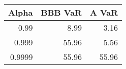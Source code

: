 \begin{tabular}{rrr}
\toprule
 Alpha &  BBB VaR &  A VaR \\
\midrule
  0.99 &      8.99 &    3.16 \\
  0.999 &     55.96 &    5.56 \\
  0.9999 &     55.96 &   55.96 \\
\bottomrule
\end{tabular}
